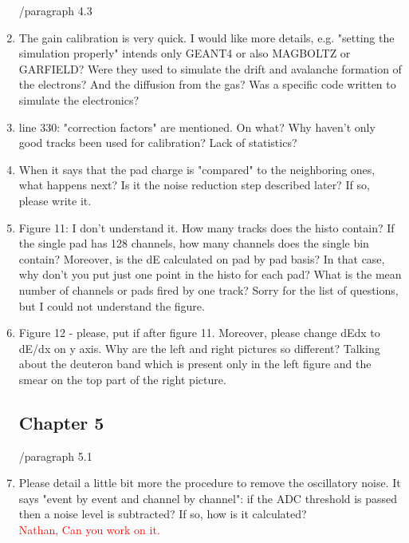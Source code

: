 \documentclass[a4paper,11pt,twoside]{article}
\begin{document}
\begin{enumerate}
        /paragraph 4.3
\item The gain calibration is very quick. I would like more details, e.g. 
   "setting the simulation properly" intends only GEANT4 or also MAGBOLTZ or 
   GARFIELD? Were they used to simulate the drift and avalanche formation of 
   the electrons? And the diffusion from the gas? Was a specific code written 
   to simulate the electronics?\\
\textcolor{blue}{ } 

\item line 330: "correction factors" are mentioned. On what? Why haven't only 
   good tracks been used for calibration? Lack of statistics?\\
\textcolor{blue}{ } 

\item When it says that the pad charge is "compared" to the neighboring ones, 
   what happens next? Is it the noise reduction step described later? If so, 
   please write it. \\
\textcolor{blue}{ } 

\item Figure 11: I don't understand it. How many tracks does the histo contain? 
   If the single pad has 128 channels, how many channels does the single bin 
   contain? Moreover, is the dE calculated on pad by pad basis? In that case, 
   why don't you put just one point in the histo for each pad? What is the mean 
   number of channels or pads fired by one track? Sorry for the list of 
   questions, but I could not understand the figure.\\
\textcolor{blue}{ } 

\item Figure 12 - please, put if after figure 11. Moreover, please change dEdx 
   to dE/dx on y axis. Why are the left and right pictures so different? 
   Talking about the deuteron band which is present only in the left figure and 
   the smear on the top part of the right picture. \\
\textcolor{blue}{ } 

\subsection*{ Chapter 5}
        /paragraph 5.1	
     
\item Please detail a little bit more the procedure to remove the oscillatory 
   noise. It says "event by event and channel by channel": if the ADC threshold 
   is passed then a noise level is subtracted? If so, how is it calculated?\\
\textcolor{red}{Nathan, Can you work on it. } 


\end{enumerate}
\end{document}
